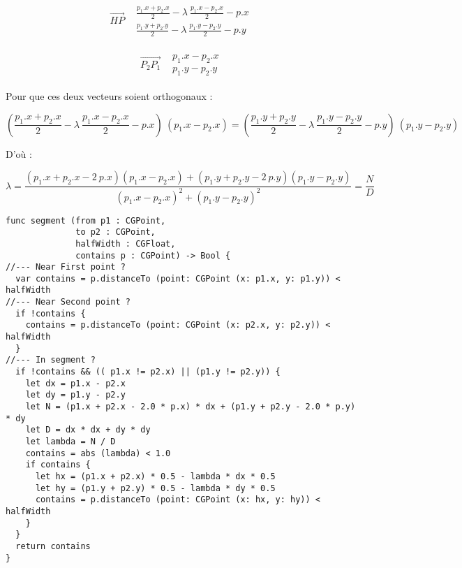 \begin{equation*}
  \begin{array}{r|l}
    \overrightarrow{HP}
  &
    \begin{array}{l}
      \displaystyle\frac{p_1.x + p_2.x}{2} - \lambda ~ \frac{p_1.x - p_2.x}{2} - p.x
    \\
      \displaystyle\frac{p_1.y + p_2.y}{2} - \lambda ~ \frac{p_1.y - p_2.y}{2} - p.y
    \end{array}
  \end{array}
\end{equation*}

\begin{equation*}
  \begin{array}{r|l}
    \overrightarrow{P_2P_1}
  &
    \begin{array}{l}
       p_1.x - p_2.x
    \\
       p_1.y - p_2.y
    \end{array}
  \end{array}
\end{equation*}

Pour que ces deux vecteurs soient orthogonaux :

\begin{equation*}
 (\displaystyle\frac{p_1.x + p_2.x}{2} - \lambda ~ \frac{p_1.x - p_2.x}{2} - p.x) ~ (p_1.x - p_2.x) = 
 (\displaystyle\frac{p_1.y + p_2.y}{2} - \lambda ~ \frac{p_1.y - p_2.y}{2} - p.y) ~ (p_1.y - p_2.y)
\end{equation*}

D'où :

\begin{equation*}
\lambda = \frac{(p_1.x + p_2.x - 2~p.x)(p_1.x - p_2.x) + (p_1.y + p_2.y - 2~p.y)(p_1.y - p_2.y)}{(p_1.x - p_2.x)^2 + (p_1.y - p_2.y)^2} = \frac{N}{D}
\end{equation*}


\begin{lstlisting}
func segment (from p1 : CGPoint,
              to p2 : CGPoint,
              halfWidth : CGFloat,
              contains p : CGPoint) -> Bool {
//--- Near First point ?
  var contains = p.distanceTo (point: CGPoint (x: p1.x, y: p1.y)) < halfWidth
//--- Near Second point ?
  if !contains {
    contains = p.distanceTo (point: CGPoint (x: p2.x, y: p2.y)) < halfWidth
  }
//--- In segment ?
  if !contains && (( p1.x != p2.x) || (p1.y != p2.y)) {
    let dx = p1.x - p2.x
    let dy = p1.y - p2.y
    let N = (p1.x + p2.x - 2.0 * p.x) * dx + (p1.y + p2.y - 2.0 * p.y) * dy
    let D = dx * dx + dy * dy
    let lambda = N / D
    contains = abs (lambda) < 1.0
    if contains {
      let hx = (p1.x + p2.x) * 0.5 - lambda * dx * 0.5
      let hy = (p1.y + p2.y) * 0.5 - lambda * dy * 0.5
      contains = p.distanceTo (point: CGPoint (x: hx, y: hy)) < halfWidth
    }
  }
  return contains
}
\end{lstlisting}

